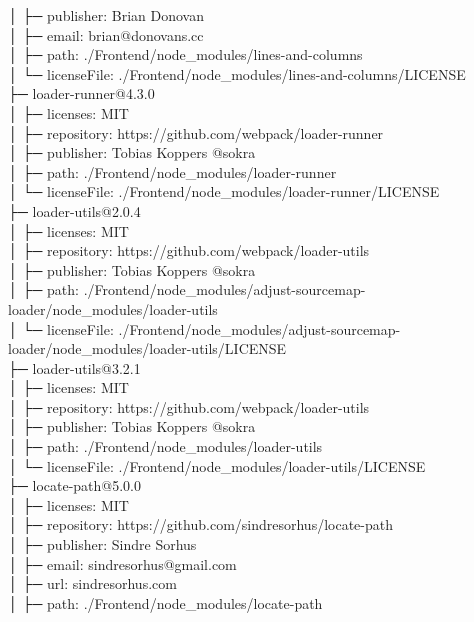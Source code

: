 \documentclass[
    paper=a4,
    twoside=false,
    parskip=half,
    listof=entryprefix,
    listof=totoc,
    index=totoc,
    bibliography=totoc,
    headsepline,
]{scrbook}
\begin{document}
    │  ├─ publisher: Brian Donovan\\
    │  ├─ email: brian@donovans.cc\\
    │  ├─ path: ./Frontend/node\_modules/lines-and-columns\\
    │  └─ licenseFile: ./Frontend/node\_modules/lines-and-columns/LICENSE\\
    ├─ loader-runner@4.3.0\\
    │  ├─ licenses: MIT\\
    │  ├─ repository: https://github.com/webpack/loader-runner\\
    │  ├─ publisher: Tobias Koppers @sokra\\
    │  ├─ path: ./Frontend/node\_modules/loader-runner\\
    │  └─ licenseFile: ./Frontend/node\_modules/loader-runner/LICENSE\\
    ├─ loader-utils@2.0.4\\
    │  ├─ licenses: MIT\\
    │  ├─ repository: https://github.com/webpack/loader-utils\\
    │  ├─ publisher: Tobias Koppers @sokra\\
    │  ├─ path: ./Frontend/node\_modules/adjust-sourcemap-loader/node\_modules/loader-utils\\
    │  └─ licenseFile: ./Frontend/node\_modules/adjust-sourcemap-loader/node\_modules/loader-utils/LICENSE\\
    ├─ loader-utils@3.2.1\\
    │  ├─ licenses: MIT\\
    │  ├─ repository: https://github.com/webpack/loader-utils\\
    │  ├─ publisher: Tobias Koppers @sokra\\
    │  ├─ path: ./Frontend/node\_modules/loader-utils\\
    │  └─ licenseFile: ./Frontend/node\_modules/loader-utils/LICENSE\\
    ├─ locate-path@5.0.0\\
    │  ├─ licenses: MIT\\
    │  ├─ repository: https://github.com/sindresorhus/locate-path\\
    │  ├─ publisher: Sindre Sorhus\\
    │  ├─ email: sindresorhus@gmail.com\\
    │  ├─ url: sindresorhus.com\\
    │  ├─ path: ./Frontend/node\_modules/locate-path\\
\end{document}
